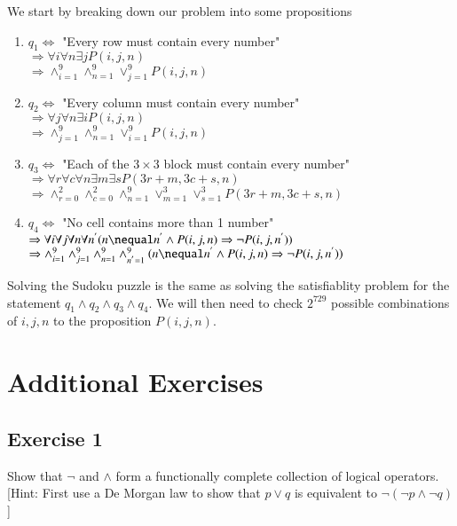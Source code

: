 \documentclass{article}
\begin{document}
\noindent We start by breaking down our problem into some propositions
\begin{enumerate}
	\item $q_{1} \Leftrightarrow$ "Every row must contain every number" \\ $\Rightarrow \forall i \forall n \exists j P(i,j,n)$ \\
	      $\Rightarrow \wedge_{i=1}^{9} \wedge_{n=1}^{9} \vee_{j=1}^{9} P(i,j,n)$
	\item $q_{2} \Leftrightarrow$ "Every column must contain every number" \\ $\Rightarrow \forall j \forall n \exists i P(i,j,n)$ \\
	      $\Rightarrow \wedge_{j=1}^{9} \wedge_{n=1}^{9} \vee_{i=1}^{9} P(i,j,n)$
	\item $q_{3} \Leftrightarrow$ "Each of the $3 \times 3$ block must contain every number" \\
	      $\Rightarrow \forall r \forall c \forall n \exists m \exists s P(3r+m, 3c+s, n)$ \\
	      $\Rightarrow \wedge_{r=0}^{2} \wedge_{c=0}^{2} \wedge_{n=1}^{9} \vee_{m=1}^{3} \vee_{s=1}^{3}P(3r+m, 3c+s, n)$
	\item $q_{4} \Leftrightarrow$ "No cell contains more than 1 number" \\
	      $\Rightarrow \forall i \forall j \forall n \forall n^{'}(n \nequal n^{'} \wedge P(i,j,n) \Rightarrow \neg P(i,j,n^{'}))$ \\
	      $\Rightarrow \wedge_{i=1}^9 \wedge_{j=1}^9 \wedge_{n=1}^9 \wedge_{n^{'}=1}^9 (n \nequal n^{'} \wedge P(i,j,n) \Rightarrow \neg P(i,j,n^{'}))$
\end{enumerate}

\noindent Solving the Sudoku puzzle is the same as solving the satisfiablity problem for the statement $q_{1} \wedge q_{2} \wedge q_{3} \wedge q_{4}$.
We will then need to check $2^{729}$ possible combinations of $i, j, n$ to the proposition $P(i,j,n)$.

\section{Additional Exercises}
\subsection*{Exercise 1}
Show that $\neg$ and $\wedge$ form a functionally complete collection of logical operators. [Hint: First use a De Morgan law
		to show that $p \vee q$ is equivalent to $\neg (\neg p \wedge \neg q)$]
\end{document}
